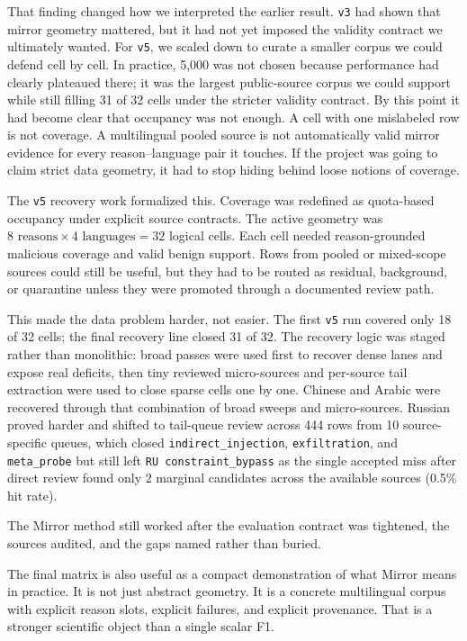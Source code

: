 \documentclass[11pt,a4paper]{article}
\begin{document}
That finding changed how we interpreted the earlier result. \texttt{v3}
had shown that mirror geometry mattered, but it had not yet imposed the
validity contract we ultimately wanted. For \texttt{v5}, we scaled down
to curate a smaller corpus we could defend cell by cell. In practice,
5,000 was not chosen because performance had clearly plateaued there; it
was the largest public-source corpus we could support while still
filling 31 of 32 cells under the stricter validity contract. By this
point it had become clear that occupancy was not enough. A cell with one
mislabeled row is not coverage. A multilingual pooled source is not
automatically valid mirror evidence for every reason--language pair it
touches. If the project was going to claim strict data geometry, it had
to stop hiding behind loose notions of coverage.

The \texttt{v5} recovery work formalized this. Coverage was redefined as
quota-based occupancy under explicit source contracts. The active
geometry was $8 \text{ reasons} \times 4 \text{ languages} = 32$
logical cells. Each cell needed reason-grounded malicious coverage and
valid benign support. Rows from pooled or mixed-scope sources could
still be useful, but they had to be routed as residual, background, or
quarantine unless they were promoted through a documented review path.

This made the data problem harder, not easier. The first \texttt{v5} run
covered only 18 of 32 cells; the final recovery line closed 31 of 32.
The recovery logic was staged rather than monolithic: broad passes were
used first to recover dense lanes and expose real deficits, then tiny
reviewed micro-sources and per-source tail extraction were used to close
sparse cells one by one. Chinese and Arabic were recovered through that
combination of broad sweeps and micro-sources. Russian proved harder and
shifted to tail-queue review across 444 rows from 10 source-specific
queues, which closed \texttt{indirect\_injection},
\texttt{exfiltration}, and \texttt{meta\_probe} but still left
\texttt{RU~constraint\_bypass} as the single accepted miss after direct
review found only 2 marginal candidates across the available sources
(0.5\% hit rate).

The Mirror method still worked after the evaluation contract was
tightened, the sources audited, and the gaps named rather than buried.

The final matrix is also useful as a compact demonstration of what
Mirror means in practice. It is not just abstract geometry. It is a
concrete multilingual corpus with explicit reason slots, explicit
failures, and explicit provenance. That is a stronger scientific object
than a single scalar F1.
\end{document}
